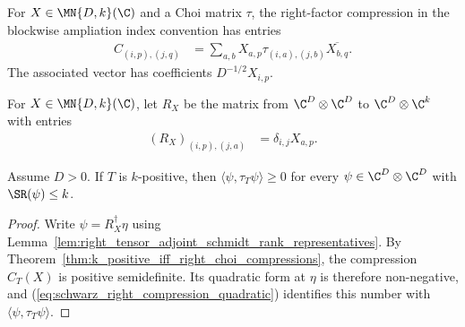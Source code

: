 \begin{definition}\label{def:choi_right_compression}
    \leanok
    For $X\in\MN{D,k}(\C)$ and a Choi matrix $\tau$, the right-factor
    compression in the blockwise ampliation index convention has entries
    \begin{align}
        C_{(i,p),(j,q)}
         & =\sum_{a,b}X_{a,p}\tau_{(i,a),(j,b)}
        \overline{X_{b,q}}.
        \label{eq:schwarz_right_choi_compression}
    \end{align}
    The associated vector has coefficients $D^{-1/2}X_{i,p}$.
\end{definition}

\begin{definition}
    \label{def:choi_right_tensor_factor}
    \leanok
    For $X\in\MN{D,k}(\C)$, let $R_X$ be the matrix from
    $\C^D\otimes\C^D$ to $\C^D\otimes\C^k$ with entries
    \begin{align}
        (R_X)_{(i,p),(j,a)}
         & =\delta_{i,j}X_{a,p}.
        \label{eq:schwarz_right_tensor_factor}
    \end{align}
\end{definition}
\begin{theorem}
    \label{thm:k_positive_schmidt_rank_choi_expectation}
    \leanok
    Assume $D>0$. If $T$ is $k$-positive, then
    $\langle\psi,\tau_T\psi\rangle\ge0$ for every
    $\psi\in\C^D\otimes\C^D$ with $\SR(\psi)\le k$.
\end{theorem}

\begin{proof}
    \leanok
    Write $\psi=R_X^\dagger\eta$ using
    Lemma~\ref{lem:right_tensor_adjoint_schmidt_rank_representatives}. By
    Theorem~\ref{thm:k_positive_iff_right_choi_compressions}, the
    compression $C_T(X)$ is positive semidefinite. Its quadratic form at
    $\eta$ is therefore non-negative, and
    (\ref{eq:schwarz_right_compression_quadratic}) identifies this number
    with $\langle\psi,\tau_T\psi\rangle$.
\end{proof}

